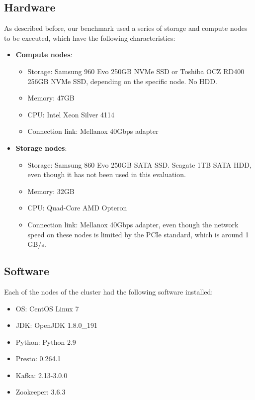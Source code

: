 \documentclass[conference]{IEEEtran}
\begin{document}
\subsection{Hardware}
As described before, our benchmark used a series of storage and compute nodes to be executed, which have the following characteristics:

\begin{itemize}
    \item \textbf{Compute nodes}:
        \begin{itemize}
            \item Storage: Samsung 960 Evo 250GB NVMe SSD or Toshiba OCZ RD400 256GB NVMe SSD, depending on the specific node. No HDD.
            \item Memory: 47GB
            \item CPU: Intel Xeon Silver 4114
            \item Connection link: Mellanox 40Gbps adapter
        \end{itemize}
    \item \textbf{Storage nodes}:
        \begin{itemize}
            \item Storage: Samsung 860 Evo 250GB SATA SSD. Seagate 1TB SATA HDD, even though it has not been used in this evaluation.
            \item Memory: 32GB
            \item CPU: Quad-Core AMD Opteron
            \item Connection link: Mellanox 40Gbps adapter, even though the network speed on these nodes is limited by the PCIe standard, which is around 1 GB/s.
        \end{itemize}
\end{itemize}

\subsection{Software}
Each of the nodes of the cluster had the following software installed:

\begin{itemize}
    \item OS: CentOS Linux 7
    \item JDK: OpenJDK 1.8.0\_191
    \item Python: Python 2.9
    \item Presto: 0.264.1
    \item Kafka: 2.13-3.0.0
    \item Zookeeper: 3.6.3
\end{itemize}
\end{document}
